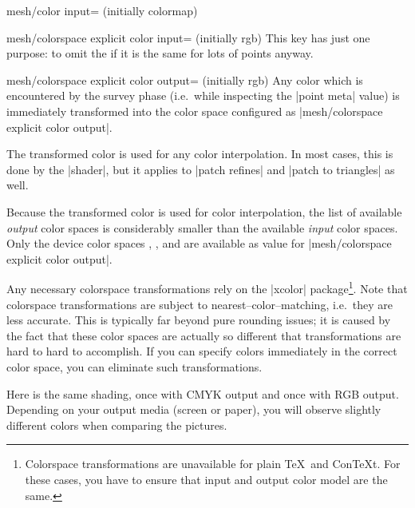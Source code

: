 {{\begin{pgfplotskey}{mesh/color input= (initially colormap)}
\begin{pgfplotskey}{%
	mesh/colorspace explicit color input= (initially rgb)%
}
	This key has just one purpose: to omit the  if it is the same for lots of points anyway.
\end{pgfplotskey}

\begin{pgfplotskey}{%
	mesh/colorspace explicit color output= (initially rgb)%
}
	Any color which is encountered by the survey phase (i.e.\ while inspecting the |point meta| value) is immediately transformed into the color space configured as |mesh/colorspace explicit color output|.

	The transformed color is used for any color interpolation. In most cases, this is done by the |shader|, but it applies to |patch refines| and |patch to triangles| as well.

	Because the transformed color is used for color interpolation, the list of available \emph{output} color spaces is considerably smaller than the available \emph{input} color spaces. Only the device color spaces , , and  are available as value for |mesh/colorspace explicit color output|.



	Any necessary colorspace transformations rely on the |xcolor| package\footnote{Colorspace transformations are unavailable for plain \TeX\ and Con\TeX t. For these cases, you have to ensure that input and output color model are the same.}. Note that colorspace transformations are subject to nearest--color--matching, i.e.\ they are less accurate. This is typically far beyond pure rounding issues; it is caused by the fact that these color spaces are actually so different that transformations are hard to hard to accomplish. If you can specify colors immediately in the correct color space, you can eliminate such transformations.

	Here is the same shading, once with CMYK output and once with RGB output. Depending on your output media (screen or paper), you will observe slightly different colors when comparing the pictures.
\begin{codeexample}[]
\end{codeexample}


\end{pgfplotskey}
\end{pgfplotskey}}}
